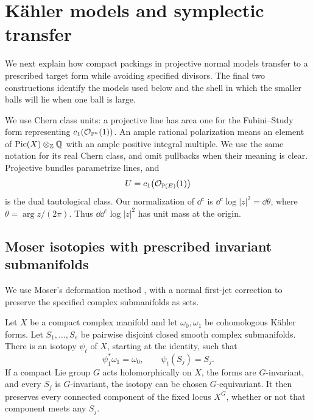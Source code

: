 \section{K\"ahler models and symplectic transfer}\label{geo:devices}

We next explain how compact packings in projective normal models
transfer to a prescribed target form while avoiding specified divisors.
The final two constructions identify the models used below and the
shell in which the smaller balls will lie when one ball is large.

We use Chern class units: a projective line has area one for the
Fubini--Study form representing \(c_1(\mathcal O_{\mathbb P^n}(1))\).
An ample rational polarization means an element of
\(\operatorname{Pic}(X)\otimes_{\mathbb Z}\mathbb Q\) with an ample positive
integral multiple. We use the same notation for its real Chern class,
and omit pullbacks when their meaning is clear.
Projective bundles parametrize lines, and
\[
 U=c_1\bigl(\mathcal O_{\mathbb P(E)}(1)\bigr)
\]
is the dual tautological class. Our normalization of \(\dd^c\) is
\(\dd^c\log|z|^2=\dd\theta\), where
\(\theta=\arg z/(2\pi)\). Thus
\(\dd\dd^c\log|z|^2\) has unit mass at the origin.

\subsection{Moser isotopies with prescribed invariant submanifolds}

We use Moser's deformation method \cite[Section~4]{Moser1965},
with a normal first-jet correction to preserve the specified
complex submanifolds as sets.

\begin{lemma}\label{geo:relative-moser}
Let \(X\) be a compact complex manifold and let \(\omega_0,\omega_1\)
be cohomologous K\"ahler forms. Let \(S_1,\ldots,S_e\) be pairwise
disjoint closed smooth complex submanifolds. There is an isotopy
\(\psi_t\) of \(X\), starting at the identity, such that
\[
 \psi_1^*\omega_1=\omega_0,\qquad \psi_t(S_j)=S_j.
\]
If a compact Lie group \(G\) acts holomorphically on \(X\), the forms
are \(G\)-invariant, and every \(S_j\) is \(G\)-invariant, the isotopy
can be chosen \(G\)-equivariant. It then preserves every connected
component of the fixed locus \(X^G\), whether or not that component
meets any \(S_j\).
\end{lemma}

